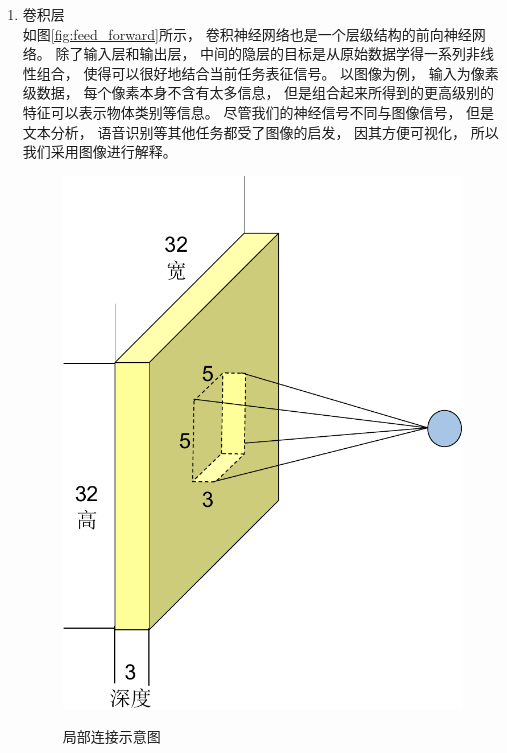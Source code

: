 \begin{enumerate}

\item 卷积层\\
如图\ref{fig:feed_forward}所示， 卷积神经网络也是一个层级结构的前向神经网络。 除了输入层和输出层， 中间的隐层的目标是从原始数据学得一系列非线性组合， 使得可以很好地结合当前任务表征信号。 以图像为例， 输入为像素级数据， 每个像素本身不含有太多信息， 但是组合起来所得到的更高级别的特征可以表示物体类别等信息。 尽管我们的神经信号不同与图像信号， 但是文本分析\cite{collobert2008unified}， 语音识别等其他任务都受了图像的启发， 因其方便可视化， 所以我们采用图像进行解释。


\begin{figure}[htb]
  \centering
  \includegraphics[scale=0.8]{Pictures/CNN/single_layer-crop.pdf}\\
  \caption{局部连接示意图}\label{fig:local_connectivity}
\end{figure}



\end{enumerate}
